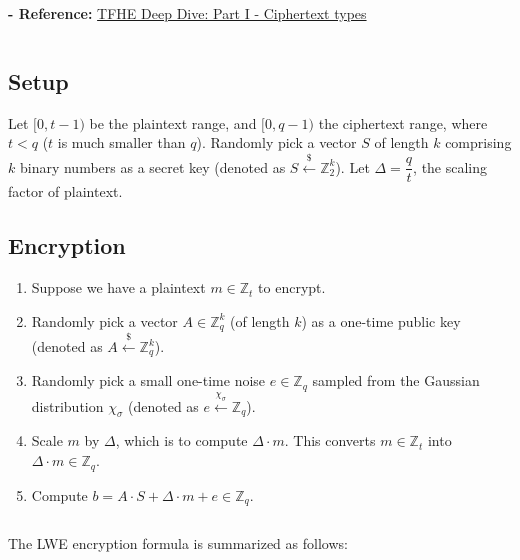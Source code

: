 
\textbf{- Reference:} 
\href{https://www.zama.ai/post/tfhe-deep-dive-part-1}{TFHE Deep Dive: Part I - Ciphertext types}~\cite{tfhe-1}



$ $




\subsection{Setup}
Let $[0, t-1)$ be the plaintext range, and $[0, q-1)$ the ciphertext range, where $t < q$ ($t$ is much smaller than $q$). Randomly pick a vector ${S}$ of length $k$ comprising $k$ binary numbers as a secret key (denoted as $S \xleftarrow{\$} \mathbb{Z}_2^k$). Let $\Delta = \dfrac{q}{t}$, the scaling factor of plaintext.

\subsection{Encryption}
\label{subsec:lwe-enc}

\begin{enumerate}
\item Suppose we have a plaintext $m \in \mathbb{Z}_t$ to encrypt. \item Randomly pick a vector ${A} \in \mathbb{Z}_q^k$ (of length $k$) as a one-time public key (denoted as $A \xleftarrow{\$} \mathbb{Z}_q^k$).
\item Randomly pick a small one-time noise $e \in \mathbb{Z}_q$ sampled from the Gaussian distribution $\chi_\sigma$ (denoted as $e \xleftarrow{\chi_\sigma} \mathbb{Z}_q$). 
\item Scale $m$ by $\Delta$, which is to compute $\Delta \cdot m$. This converts $m \in \mathbb{Z}_t$ into $\Delta \cdot m \in \mathbb{Z}_q$.
\item Compute $b = {A} \cdot {S} + \Delta \cdot m + e \in \mathbb{Z}_q$. 
\end{enumerate}

$ $

The LWE encryption formula is summarized as follows:

$ $

